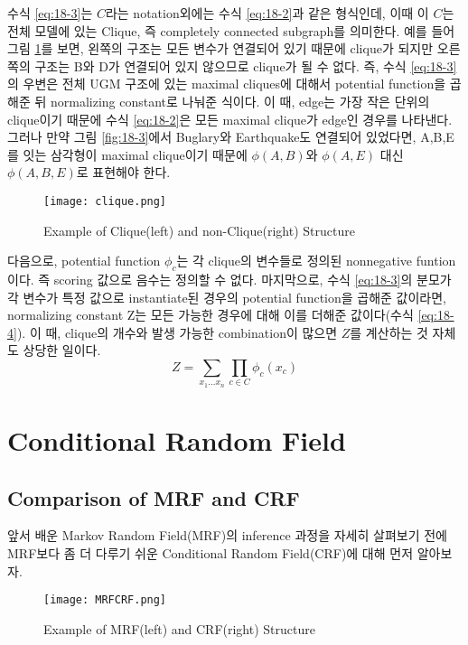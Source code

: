 \documentclass[draft=false]{oblivoir}
\begin{document}
수식 \ref{eq:18-3}는 $C$라는 notation외에는 수식 \ref{eq:18-2}과 같은 형식인데, 이때 이 $C$는 전체 모델에 있는 Clique, 즉 completely connected subgraph를 의미한다. 예를 들어 그림 \ref{fig:18-4}를 보면, 왼쪽의 구조는 모든 변수가 연결되어 있기 때문에 clique가 되지만 오른쪽의 구조는 B와 D가 연결되어 있지 않으므로 clique가 될 수 없다. 즉, 수식 \ref{eq:18-3}의 우변은 전체 UGM 구조에 있는 maximal cliques에 대해서 potential function을 곱해준 뒤 normalizing constant로 나눠준 식이다. 이 때, edge는 가장 작은 단위의 clique이기 때문에 수식 \ref{eq:18-2}은 모든 maximal clique가 edge인 경우를 나타낸다. 그러나 만약 그림 \ref{fig:18-3}에서 Buglary와 Earthquake도 연결되어 있었다면, A,B,E를 잇는 삼각형이 maximal clique이기 때문에 $\phi(A,B)$와 $\phi(A,E)$ 대신 $\phi(A,B,E)$로 표현해야 한다. 

\begin{figure}[ht] \centering 
  \texttt{[image: clique.png]}
  \caption{Example of Clique(left) and non-Clique(right) Structure}
  \label{fig:18-4}
\end{figure}



다음으로, potential function $\phi_c$는 각 clique의 변수들로 정의된 nonnegative funtion이다. 즉 scoring 값으로 음수는 정의할 수 없다. 마지막으로, 수식 \ref{eq:18-3}의 분모가 각 변수가 특정 값으로 instantiate된 경우의 potential function을 곱해준 값이라면, normalizing constant Z는 모든 가능한 경우에 대해 이를 더해준 값이다(수식 \ref{eq:18-4}). 이 때, clique의 개수와 발생 가능한 combination이 많으면 $Z$를 계산하는 것 자체도 상당한 일이다.
\begin{equation}
	Z = \sum_{x_1\dots x_n}\prod_{c\in C}\phi_c(x_c)
\label{eq:18-4}
\end{equation}

\section{Conditional Random Field}

\subsection{Comparison of MRF and CRF}
앞서 배운 Markov Random Field(MRF)의 inference 과정을 자세히 살펴보기 전에 MRF보다 좀 더 다루기 쉬운 Conditional Random Field(CRF)에 대해 먼저 알아보자. 

\begin{figure}[ht] \centering 
  \texttt{[image: MRFCRF.png]}
  \caption{Example of MRF(left) and CRF(right) Structure}
  \label{fig:18-5}
\end{figure}
\end{document}
